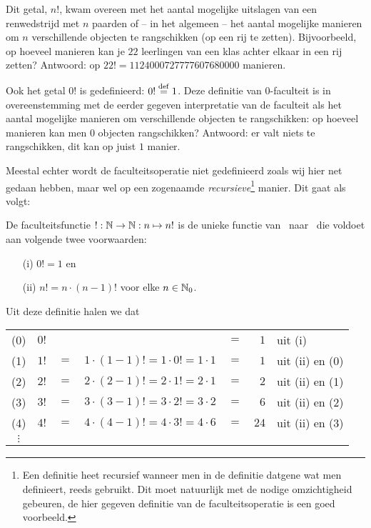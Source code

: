 \documentclass{ximera}
\begin{document}
Dit getal, $n!$, kwam overeen met het aantal mogelijke uitslagen
van een renwedstrijd met $n$ paarden of -- in het algemeen -- het
aantal mogelijke manieren om $n$ verschillende objecten te
rangschikken (op een rij te zetten). Bijvoorbeeld, op hoeveel
manieren kan je $22$ leerlingen van een klas achter elkaar in een
rij zetten? Antwoord: op $22!=1124000727777607680000$ manieren.

Ook het getal $0!$ is gedefinieerd: $0!\overset{\mathrm{def}}{=}1$. Deze definitie
van $0$-faculteit is in overeenstemming met de eerder gegeven
interpretatie van de faculteit als het aantal mogelijke manieren
om verschillende objecten te rangschikken: op hoeveel manieren kan
men $0$ objecten rangschikken? Antwoord: er valt niets te
rangschikken, dit kan op juist $1$ manier.

Meestal echter wordt de faculteitsoperatie niet gedefinieerd zoals
wij hier net gedaan hebben, maar wel op een zogenaamde
\emph{recursieve}\footnote{Een definitie heet recursief wanneer
men in de definitie datgene wat men definieert, reeds gebruikt.
Dit moet natuurlijk met de nodige omzichtigheid gebeuren, de hier
gegeven definitie van de faculteitsoperatie is een goed
voorbeeld.} manier. Dit gaat als volgt:
\begin{definition}
De faculteitsfunctie $!:\mathbb{N}\to\mathbb{N}:n\mapsto n!$ is de unieke functie
van \N\ naar \N\ die voldoet aan volgende twee voorwaarden:
\begin{enumerate}
\item[(i)] $0!=1$ en
\item[(ii)] $n!=n\cdot(n-1)!$ voor elke $n\in\mathbb{N}_0$.
\end{enumerate}
\end{definition}

Uit deze definitie halen we dat

\noindent
\begin{tabular}{cl@{\;}c@{\;}c@{\;}c@{\;}rl}
(0) & $0!$ & & & $=$ & $1$ & uit (i)\\
(1) & $1!$ & $=$ & $1\cdot(1-1)!=1\cdot0!=1\cdot1$ & $=$ & $1$ & uit (ii) en (0)\\
(2) & $2!$ & $=$ & $2\cdot(2-1)!=2\cdot1!=2\cdot1$ & $=$ & $2$ & uit (ii) en (1)\\
(3) & $3!$ & $=$ & $3\cdot(3-1)!=3\cdot2!=3\cdot2$ & $=$ & $6$ & uit (ii) en (2)\\
(4) & $4!$ & $=$ & $4\cdot(4-1)!=4\cdot3!=4\cdot6$ & $=$ & $24$ & uit (ii) en (3)\\
$\vdots$ & & & & & &
\end{tabular}
\end{document}

